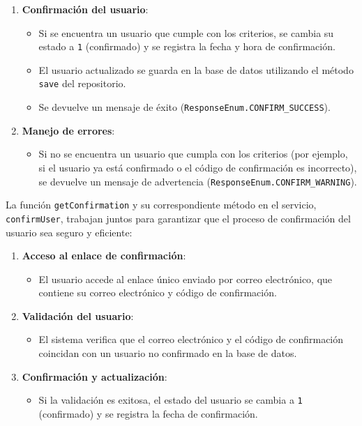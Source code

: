\documentclass[draft]{scrbook}
\begin{document}
\begin{enumerate}
\begin{enumerate}
    \item \textbf{Confirmación del usuario}:
    \begin{itemize}
        \item Si se encuentra un usuario que cumple con los criterios, se cambia su estado a \texttt{1} (confirmado) y se registra la fecha y hora de confirmación.
        \item El usuario actualizado se guarda en la base de datos utilizando el método \texttt{save} del repositorio.
        \item Se devuelve un mensaje de éxito (\texttt{ResponseEnum.CONFIRM\_SUCCESS}).
    \end{itemize}

    \item \textbf{Manejo de errores}:
    \begin{itemize}
        \item Si no se encuentra un usuario que cumpla con los criterios (por ejemplo, si el usuario ya está confirmado o el código de confirmación es incorrecto), se devuelve un mensaje de advertencia (\texttt{ResponseEnum.CONFIRM\_WARNING}).
    \end{itemize}
\end{enumerate}

La función \texttt{getConfirmation} y su correspondiente método en el servicio, \texttt{confirmUser}, trabajan juntos para garantizar que el proceso de confirmación del usuario sea seguro y eficiente:

\begin{enumerate}
    \item \textbf{Acceso al enlace de confirmación}:
    \begin{itemize}
        \item El usuario accede al enlace único enviado por correo electrónico, que contiene su correo electrónico y código de confirmación.
    \end{itemize}

    \item \textbf{Validación del usuario}:
    \begin{itemize}
        \item El sistema verifica que el correo electrónico y el código de confirmación coincidan con un usuario no confirmado en la base de datos.
    \end{itemize}

    \item \textbf{Confirmación y actualización}:
    \begin{itemize}
        \item Si la validación es exitosa, el estado del usuario se cambia a \texttt{1} (confirmado) y se registra la fecha de confirmación.
    \end{itemize}


\end{enumerate}
\end{enumerate}
\end{document}
